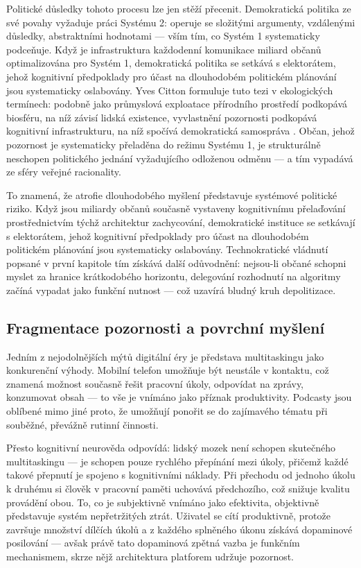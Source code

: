 Politické důsledky tohoto procesu lze jen stěží přecenit. Demokratická politika ze své povahy vyžaduje práci Systému 2: operuje se složitými argumenty, vzdálenými důsledky, abstraktními hodnotami — vším tím, co Systém 1 systematicky podceňuje. Když je infrastruktura každodenní komunikace miliard občanů optimalizována pro Systém 1, demokratická politika se setkává s elektorátem, jehož kognitivní předpoklady pro účast na dlouhodobém politickém plánování jsou systematicky oslabovány. Yves Citton formuluje tuto tezi v ekologických termínech: podobně jako průmyslová exploatace přírodního prostředí podkopává biosféru, na níž závisí lidská existence, vyvlastnění pozornosti podkopává kognitivní infrastrukturu, na níž spočívá demokratická samospráva \parencite{Citton17}.
Občan, jehož pozornost je systematicky přeladěna do režimu Systému 1, je strukturálně neschopen politického jednání vyžadujícího odloženou odměnu — a tím vypadává ze sféry veřejné racionality.

To znamená, že atrofie dlouhodobého myšlení představuje systémové politické riziko. Když jsou miliardy občanů současně vystaveny kognitivnímu přelaďování prostřednictvím týchž architektur zachycování, demokratické instituce se setkávají s elektorátem, jehož kognitivní předpoklady pro účast na dlouhodobém politickém plánování jsou systematicky oslabovány. Technokratické vládnutí popsané v první kapitole tím získává další odůvodnění: nejsou-li občané schopni myslet za hranice krátkodobého horizontu, delegování rozhodnutí na  algoritmy začíná vypadat jako funkční nutnost — což uzavírá bludný kruh depolitizace.

\subsection{Fragmentace pozornosti a povrchní myšlení}

Jedním z nejodolnějších mýtů digitální éry je představa multitaskingu jako konkurenční výhody. Mobilní telefon umožňuje být neustále v kontaktu, což znamená možnost současně řešit pracovní úkoly, odpovídat na zprávy, konzumovat obsah — to vše je vnímáno jako příznak produktivity. Podcasty jsou oblíbené mimo jiné proto, že umožňují ponořit se do zajímavého tématu při souběžné, převážně rutinní činnosti.

Přesto kognitivní neurověda odpovídá: lidský mozek není schopen skutečného multitaskingu — je schopen pouze rychlého přepínání mezi úkoly, přičemž každé takové přepnutí je spojeno s kognitivními náklady. Při přechodu od jednoho úkolu k druhému si člověk v pracovní paměti uchovává  předchozího, což snižuje kvalitu provádění obou. To, co je subjektivně vnímáno jako efektivita, objektivně představuje systém nepřetržitých ztrát. Uživatel se cítí produktivně, protože završuje množství dílčích úkolů a z každého splněného úkonu získává dopaminové posilování — avšak právě tato dopaminová zpětná vazba je funkčním mechanismem, skrze nějž architektura platforem udržuje pozornost.

